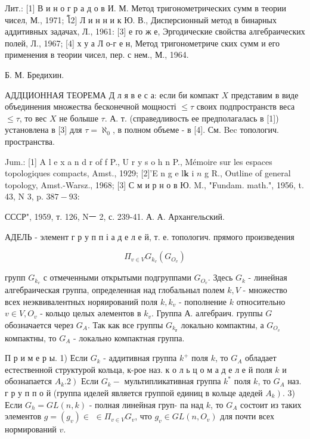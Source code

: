 \documentclass[10pt]{article}
\begin{document}
Лит.: [1] В и н о г р а д о в И. М. Метод тригонометрических сумм в теории чисел, М., 1971; โ2] Л и н н и к Ю. В., Дисперсионный метод в бинарных аддитивных задачах, Л., 1961: [3] е го ж е, Эргодические свойства алгебраических полей, Л., 1967; [4] х у а Л о-г е н, Метод тригонометриче ских сумм и его применения в теории чисел, пер. с нем., М., 1964.



Б. М. Бредихин.



АДДЦИОННАЯ ТЕОРЕМА Д л я в е с а: если би компакт $X$ представим в виде объединения множества бесконечной мощності $\leqslant \tau$ своих подпространств веса $\leqslant \tau$, то вес $X$ не болыше $\tau$. А. т. (справедливость ее предполагалась в [1]) установлена в [3] для $\tau=\aleph_{0}$, в полном объеме - в [4]. См. Bec топологич. пространства.



Jum.: [1] A l e x a n d r of f P., U r y s o h n P., Mémoire sur les espaces topologiques compacts, Amst., 1929; [2]'E n g e l$\mathbf{k}$ i $n$ g R., Outline of general topology, Amst.-Warsz., 1968; [3] С м и р н о в Ю. M., "Fundam. math.", 1956, t. 43, N 3, p. $387-93:$

СССР", 1959, т. 126, Nㅡ 2, с. 239-41. А. А. Архангельский.



АДЕЛЬ - элемент г р у п п і а д е л е й, т. е. топологич. прямого произведения



\[

\Pi_{v \in V} G_{k_{v}}\left(G_{O_{v}}\right)

\]



групп $G_{k_{v}}$ с отмеченными открытыми подгруппами $G_{O_{v}}$. Здесь $G_{k}$ - линейная алгебраическая группа, определенная над глобальныл полем $k, V$ - множество всех неэквивалентных норяирований поля $k, k_{v}$ - пополнение $k$ относительно $v \in V, O_{v}$ - кольцо целых әлементов в $k_{v}$. Группа А. алгебраич. группы $G$ обозначается через $G_{A}$. Так как все группы $G_{k_{\boldsymbol{r}}}$ локально компактны, а $G_{O_{v}}$ компактны, то $G_{A}$ - локально компактная группа.



П р и м е р ы. 1) Если $G_{k}$ - аддитивная группа $k^{+}$ поля $k$, то $G_{A}$ обладает естественной структурой кольца, к-рое наз. к о л ь ц о м а д е л е й поля $k$ и обознапается $\left.A_{k} .2\right)$ Если $G_{k}-$ мультипликативная группа $k^{*}$ поля $k$, то $G_{A}$ наз. г р у п п о й (группа иделей является группой единиц в кольце адедей $\left.A_{k}\right)$. 3) Если $G_{h}=G L(n, k)$ - полная линейная груп- па над $k$, то $G_{A}$ состоит из таких элементов $g=\left(g_{v}\right) \in$ $\in \Pi_{v \in V} G_{v}$, что $g_{v} \in G L\left(n, O_{v}\right)$ для почти всех нормирований $v$.
\end{document}

